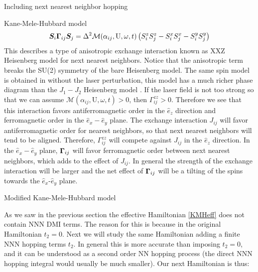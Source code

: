 \begin{section}{Including next nearest neighbor hopping}
\begin{subsection}{Kane-Mele-Hubbard model}
\begin{equation*}
\boldsymbol{S}_i \boldsymbol{\Gamma}_{ij} \boldsymbol{S}_j = \Delta^2 \mathcal{M}(\alpha_{ij}, \text{U}, \omega, t) \left(S_i^zS_j^z - S_i^xS_j^x - S_i^yS_j^y\right)
\end{equation*}
This describes a type of anisotropic exchange interaction known as XXZ Heisenberg model for next nearest neighbors. Notice that the anisotropic term breaks the SU(2) symmetry of the bare Heisenberg model. The same spin model is obtained in \cite{Rachel2010} without the laser perturbation, this model has a much richer phase diagram than the $J_1-J_2$ Heisenberg model \cite{Vaezi2012}. If the laser field is not too strong so that we can assume $\mathcal{M}(\alpha_{ij}, \text{U}, \omega, t) > 0$, then $\Gamma^{zz}_{ij} > 0$. Therefore we see that this interaction favors antiferromagnetic order in the $\hat{e}_z$ direction and ferromagnetic order in the $\hat{e}_x-\hat{e}_y$ plane. The exchange interaction $J_{ij}$ will favor antiferromagnetic order for nearest neighbors, so that next nearest neighbors will tend to be aligned. Therefore, $\Gamma^{zz}_{ij}$ will compete against $J_{ij}$ in the $\hat{e}_z$ direction. In the $\hat{e}_x-\hat{e}_y$ plane, $\boldsymbol{\Gamma}_{ij}$ will favor ferromagnetic order between next nearest neighbors, which adds to the effect of $J_{ij}$. In general the strength of the exchange interaction will be larger and the net effect of $\boldsymbol{\Gamma}_{ij}$ will be a tilting of the spins towards the $\hat{e}_x$-$\hat{e}_y$ plane.

\end{subsection}

\begin{subsection}{Modified Kane-Mele-Hubbard model}

As we saw in the previous section the effective Hamiltonian \ref{KMHeff} does not contain NNN DMI terms. The reason for this is because in the original Hamiltonian $t_2 = 0$. Next we will study the same Hamiltonian adding a finite NNN hopping terms $t_2$. In general this is more accurate than imposing $t_2 = 0$, and it can be understood as a second order NN hopping process (the direct NNN hopping integral would usually be much smaller). Our next Hamiltonian is thus:


\end{subsection}
\end{section}
